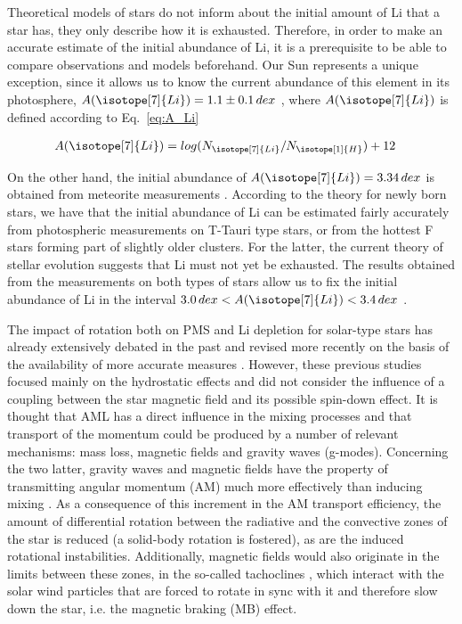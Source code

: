 \documentclass[fleqn,usenatbib]{mnras}
\begin{document}
Theoretical models of stars do not inform about the initial amount of Li that a star has, they only describe how it is exhausted. Therefore, in order to make an accurate estimate of the initial abundance of Li, it is a prerequisite to be able to compare observations and models beforehand. Our Sun represents a unique exception, since it allows us to know the current abundance of this element in its photosphere, $A(\isotope[7]{Li}) = 1.1 \pm 0.1 \, dex$ \citep{Jeffries2004}, where $A(\isotope[7]{Li})$ is defined according to Eq.~\ref{eq:A_Li}\par


\begin{ceqn}
\begin{align}
    A(\isotope[7]{Li}) &= log(N_{\isotope[7]{Li}} / N_{\isotope[1]{H}}) + 12
    \label{eq:A_Li}
\end{align}
\end{ceqn}

On the other hand, the initial abundance of $A(\isotope[7]{Li}) = 3.34 \, dex$ is obtained from meteorite measurements \citep{Randich2006}. According to the theory for newly born stars, we have that the initial abundance of Li can be estimated fairly accurately from photospheric measurements on T-Tauri type stars, or from the hottest F stars forming part of slightly older clusters. For the latter, the current theory of stellar evolution suggests that Li must not yet be exhausted. The results obtained from the measurements on both types of stars allow us to fix the initial abundance of Li in the interval $3.0 \, dex < A(\isotope[7]{Li}) < 3.4 \, dex$ \citep{Randich2006}.\par

The impact of rotation both on PMS and Li depletion for solar-type stars has already extensively debated in the past \citep{Pinsonneault1997,Jeffries2004,Somers2014} and revised more recently on the basis of the availability of more accurate measures \citep{Bouvier2016}. However, these previous studies focused mainly on the hydrostatic effects and did not consider the influence of a coupling between the star magnetic field and its possible spin-down effect. It is thought that AML has a direct influence in the mixing processes and that transport of the momentum could be produced by a number of relevant mechanisms: mass loss, magnetic fields and gravity waves (g-modes). Concerning the two latter, gravity waves \citep{Charbonnel2005} and magnetic fields \citep{Eggenberger2009} have the property of transmitting angular momentum (AM) much more effectively than inducing mixing \citep{Denissenkov2007}. As a consequence of this increment in the AM transport efficiency, the amount of differential rotation between the radiative and the convective zones of the star is reduced (a solid-body rotation is fostered), as are the induced rotational instabilities. Additionally, magnetic fields would also originate in the limits between these zones, in the so-called tachoclines \citep{Aschwanden2014, Guerrero2016}, which interact with the solar wind particles that are forced to rotate in sync with it and therefore slow down the star, i.e. the magnetic braking (MB) effect. \par
\end{document}
